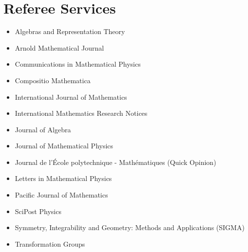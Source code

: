 \documentclass[11pt,letterpaper,roman,colorlinks,urlcolor=blue,linkcolor=blue
]{moderncv}
\begin{document}
\section{Referee Services}
\begin{itemize}[parsep=-0.2em, leftmargin=3.55cm]
    \item Algebras and Representation Theory 
    \item Arnold Mathematical Journal
    \item Communications in Mathematical Physics 
    \item Compositio Mathematica
    \item International Journal of Mathematics
    \item International Mathematics Research Notices
    \item Journal of Algebra
    \item Journal of Mathematical Physics 
    \item Journal de l'École polytechnique - Mathématiques (Quick Opinion)
    \item Letters in Mathematical Physics 
    \item Pacific Journal of Mathematics
    \item SciPost Physics
    \item Symmetry, Integrability and Geometry: Methods and Applications (SIGMA) 
    \item Transformation Groups 
\end{itemize}
\end{document}
